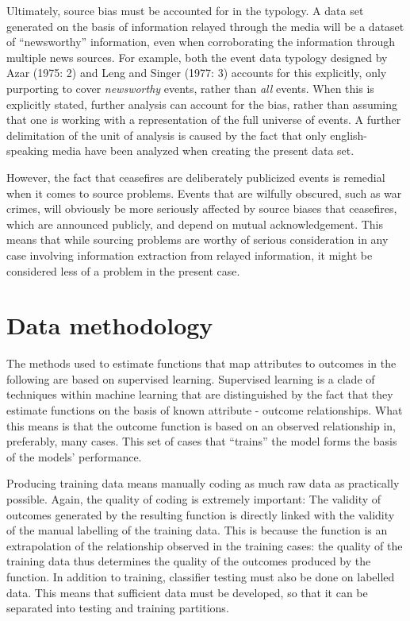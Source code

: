 \documentclass[12pt,twoside]{reedthesis}
\begin{document}
Ultimately, source bias must be accounted for in the typology. A data
set generated on the basis of information relayed through the media will
be a dataset of ``newsworthy'' information, even when corroborating the
information through multiple news sources. For example, both the event
data typology designed by Azar (1975: 2) and Leng and Singer (1977: 3)
accounts for this explicitly, only purporting to cover \emph{newsworthy}
events, rather than \emph{all} events. When this is explicitly stated,
further analysis can account for the bias, rather than assuming that one
is working with a representation of the full universe of events. A
further delimitation of the unit of analysis is caused by the fact that
only english-speaking media have been analyzed when creating the present
data set.

However, the fact that ceasefires are deliberately publicized events is
remedial when it comes to source problems. Events that are wilfully
obscured, such as war crimes, will obviously be more seriously affected
by source biases that ceasefires, which are announced publicly, and
depend on mutual acknowledgement. This means that while sourcing
problems are worthy of serious consideration in any case involving
information extraction from relayed information, it might be considered
less of a problem in the present case.

\chapter{Data methodology}\label{data-methodology}

The methods used to estimate functions that map attributes to outcomes
in the following are based on supervised learning. Supervised learning
is a clade of techniques within machine learning that are distinguished
by the fact that they estimate functions on the basis of known attribute
- outcome relationships. What this means is that the outcome function is
based on an observed relationship in, preferably, many cases. This set
of cases that ``trains'' the model forms the basis of the models'
performance.

Producing training data means manually coding as much raw data as
practically possible. Again, the quality of coding is extremely
important: The validity of outcomes generated by the resulting function
is directly linked with the validity of the manual labelling of the
training data. This is because the function is an extrapolation of the
relationship observed in the training cases: the quality of the training
data thus determines the quality of the outcomes produced by the
function. In addition to training, classifier testing must also be done
on labelled data. This means that sufficient data must be developed, so
that it can be separated into testing and training partitions.
\end{document}
